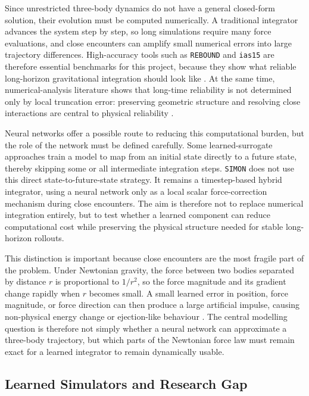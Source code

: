 \documentclass[12pt]{article}
\begin{document}
Since unrestricted three-body dynamics do not have a general closed-form solution,
their evolution must be computed numerically. A traditional integrator advances the
system step by step, so long simulations require many force evaluations, and close
encounters can amplify small numerical errors into large trajectory differences. High-accuracy
tools such as \texttt{REBOUND} and \texttt{ias15} are therefore essential benchmarks for
this project, because they show what reliable long-horizon gravitational integration
should look like \cite{Rein2012,Rein_2014}. At the same time, numerical-analysis
literature shows that long-time reliability is not determined only by local truncation
error: preserving geometric structure and resolving close interactions are central to
physical reliability \cite{hairer2006geometric,boekholt2015reliability}.

Neural networks offer a possible route to reducing this computational burden, but the
role of the network must be defined carefully. Some learned-surrogate approaches train
a model to map from an initial state directly to a future state, thereby skipping some
or all intermediate integration steps. \texttt{SIMON} does not use this direct
state-to-future-state strategy. It remains a timestep-based hybrid integrator, using
a neural network only as a local scalar force-correction mechanism during close
encounters. The aim is therefore not to replace numerical integration entirely, but to
test whether a learned component can reduce computational cost while preserving the
physical structure needed for stable long-horizon rollouts.

This distinction is important because close encounters are the most fragile part of the
problem. Under Newtonian gravity, the force between two bodies separated by distance
$r$ is proportional to $1/r^2$, so the force magnitude and its gradient change rapidly
when $r$ becomes small. A small learned error in position, force magnitude, or force
direction can then produce a large artificial impulse, causing non-physical energy
change or ejection-like behaviour \cite{Dehnen2001}. The central modelling question is
therefore not simply whether a neural network can approximate a three-body trajectory,
but which parts of the Newtonian force law must remain exact for a learned integrator
to remain dynamically usable.

\subsection{Learned Simulators and Research Gap}
\end{document}
